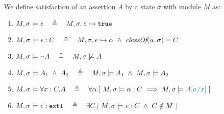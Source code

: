 \begin{definition} 
\label{def:chainmail-semantics}
We define satisfaction of an assertion $A$ by a %
state $\sigma$ with 
 module $M$ as:
\begin{enumerate}
\item
\label{cExpr}
$\satisfiesA{M}{\sigma}{{\re}}\ \ \ \triangleq \ \ \   \eval{M}{\sigma}{{\re}}{\true}$
\item
\label{cClass}
$M , \sigma \models {{\mathit{e}}} : C\ \ \ \triangleq \ \ \   M, \sigma, {\mathit{e}} \hookrightarrow \alpha\   \wedge \ \textit{classOf}(\alpha, \sigma)= C$
\item
$\satisfiesA{M}{\sigma}{\neg A}\ \ \ \triangleq \ \ \   {M},{\sigma}\not\models{A}$
\item
$\satisfiesA{M}{\sigma}{A_1\ \wedge\ A_2}\ \ \ \triangleq \ \ \   \satisfiesA{M}{\sigma}{A_1} \   \wedge \ \satisfiesA{M}{\sigma}{A_2}$

\item
\label{quant1}
$\satisfiesA{M}{\sigma}{\all{x:C}{A}} \ \ \ \triangleq \ \ \   
\forall \alpha.[\   \satisfiesA {M}{\sigma} {\alpha:C}  \ \Longrightarrow   \ \satisfiesA{M}{\sigma} \sdN{A[\alpha/x]} \ ] $

\item
\label{cExternal}
$\satisfiesA{M}{\sigma}{\external{{\re}}} \ \ \ \triangleq \ \ \  \exists C.[\ \satisfiesA{M}{\sigma}{{{\re}} : C} \ \wedge \ C \notin M \ ]$
\end{enumerate}
\end{definition}

 



